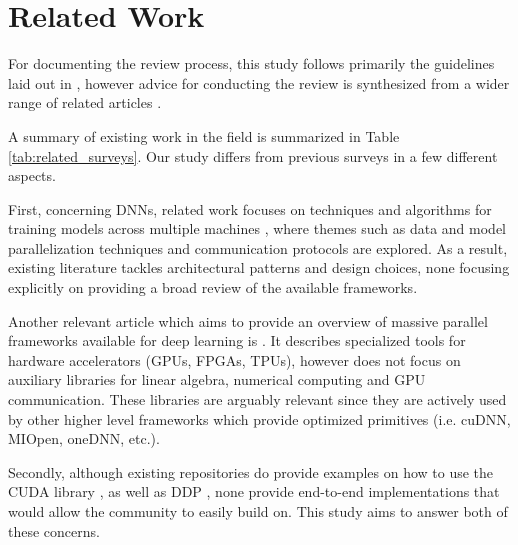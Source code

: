 
\section{Related Work}
\label{sec:related_work}
For documenting the review process, this study follows primarily the guidelines laid out in
\cite{keele_systematic_2007}, however advice for conducting the review is synthesized from a wider
range of related articles
\cite{brereton_lessons_2007-1,kitchenham_procedures_nodate,budgen_reporting_2018,dos_santos_sustainable_2024}.

A summary of existing work in the field is summarized in Table \ref{tab:related_surveys}. Our study
differs from previous surveys in a few different aspects.

First, concerning DNNs, related work focuses on techniques and algorithms for training models
across multiple machines \cite{dehghani_distributed_2023, chahal_hitchhikers_2018,
	berloco_systematic_2022}, where themes such as data and model parallelization techniques and
communication protocols are explored. As a result, existing literature tackles architectural
patterns and design choices, none focusing explicitly on providing a broad review of the available
frameworks.

Another relevant article which aims to provide an overview of massive parallel frameworks available
for deep learning is \cite{nguyen_machine_2019}. It describes specialized tools for hardware
accelerators (GPUs, FPGAs, TPUs), however does not focus on auxiliary libraries for linear algebra,
numerical computing and GPU communication. These libraries are arguably relevant since they are
actively used by other higher level frameworks which provide optimized primitives (i.e. cuDNN,
MIOpen, oneDNN, etc.).

Secondly, although existing repositories do provide examples on how to use the CUDA library
\cite{noauthor_nvidiacuda-samples_2025}, as well as DDP
\cite{noauthor_examplesdistributedddpreadmemd_nodate}, none provide end-to-end implementations that
would allow the community to easily build on. This study aims to answer both of these concerns.

